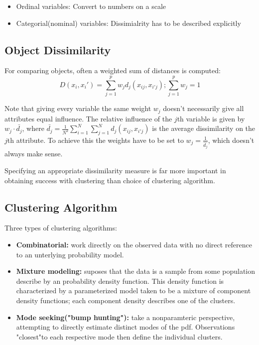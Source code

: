 \begin{itemize}
    \item Ordinal variables: Convert to numbers on a scale
    \item Categorial(nominal) variables: Dissimialrity has to be described explicitly
\end{itemize}

\subsection*{Object Dissimilarity}
For comparing objects, often a weighted sum of distances is computed:
\[D(x_i, x_i') = \sum_{j=1}^p w_j d_j(x_{ij}, x_{i'j}); \sum_{j=1}^p w_j = 1\]

Note that giving every variable the same weight \(w_j\) doesn't necessarily give all attributes equal influence. The relative influence of the \(j\)th variable is given by \(w_j \cdot \bar{d_j}\), where \(\bar{d_j} = \frac{1}{N^2} \sum_{i=1}^{N}\sum_{j=1}^{N}d_j(x_{ij}, x_{i'j})\) is the average dissimilarity on the \(j\)th attribute. To achieve this the weights have to be set to \(w_j = \frac{1}{\hat{d_j}}\), which doesn't always make sense.

Specifying an appropriate dissimilarity measure is far more important in obtaining success with clustering than choice of clustering algorithm.

\subsection*{Clustering Algorithm}
Three types of clustering algorithms:
\begin{itemize}
    \item \textbf{Combinatorial:} work directly on the observed data with no direct reference to an unterlying probability model.
    \item \textbf{Mixture modeling:} suposes that the data is a sample from some population describe by an probability density function. This density function is characterized by a parameterized model taken to be a mixture of component density functions; each component density describes one of the clusters.
    \item \textbf{Mode seeking("bump hunting"):} take a nonparamteric perspective, attempting to directly estimate distinct modes of the pdf. Observations "closest"to each respective mode then define the individual clusters.
\end{itemize}

